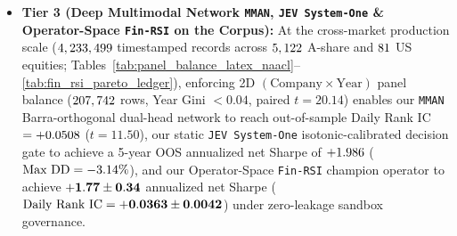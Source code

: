 \begin{itemize}
    \item \textbf{Tier 3 (Deep Multimodal Network \texttt{MMAN}, \texttt{JEV System-One} \& Operator-Space \texttt{Fin-RSI} on the \CorpusTotalShort{} Corpus):} At the cross-market production scale ($4,233,499$ timestamped records across $5,122$ A-share and $81$ US equities; Tables~\ref{tab:panel_balance_latex_naacl}--\ref{tab:fin_rsi_pareto_ledger}), enforcing 2D $(\text{Company} \times \text{Year})$ panel balance ($207,742$ rows, Year Gini $<0.04$, paired $t=20.14$) enables our \texttt{MMAN} Barra-orthogonal dual-head network to reach out-of-sample Daily Rank IC $= +0.0508$ ($t=11.50$), our static \texttt{JEV System-One} isotonic-calibrated decision gate to achieve a 5-year OOS annualized net Sharpe of $+1.986$ ($\text{Max DD} = -3.14\%$), and our Operator-Space \texttt{Fin-RSI} champion operator to achieve $\mathbf{+1.77{} \pm 0.34{}}$ annualized net Sharpe ($\text{Daily Rank IC} = \mathbf{+0.0363{} \pm 0.0042{}}$) under zero-leakage sandbox governance.
\end{itemize}

